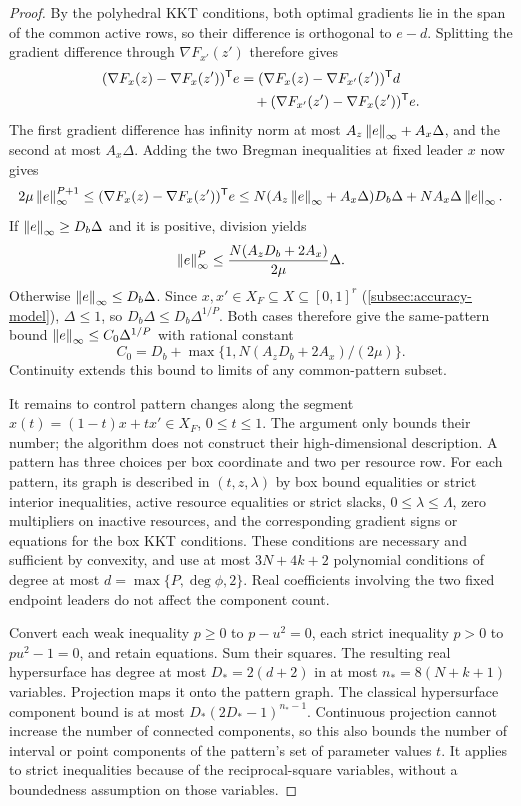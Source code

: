 \begin{proof}
By the polyhedral KKT conditions, both optimal gradients lie in the span
of the common active rows, so their difference is orthogonal to $e-d$.
Splitting the gradient difference through $\nabla F_{x'}(z')$ therefore gives
\[
 \begin{aligned}
 (\nabla F_x(z)-\nabla F_x(z'))^{\mathsf T} e
 &= (\nabla F_x(z)-\nabla F_{x'}(z'))^{\mathsf T} d\\
 &\quad +(\nabla F_{x'}(z')-\nabla F_x(z'))^{\mathsf T} e.
 \end{aligned}
\]
The first gradient difference has infinity norm at most
$A_z\left\lVert e\right\rVert_\infty+A_x\Delta$, and the second at most $A_x\Delta$.
Adding the two Bregman inequalities at fixed leader $x$ now gives
\[
 2\mu\left\lVert e\right\rVert_\infty^{P+1}
 \le(\nabla F_x(z)-\nabla F_x(z'))^{\mathsf T} e
 \le N(A_z\left\lVert e\right\rVert_\infty+A_x\Delta)D_b\Delta
                                      +NA_x\Delta\left\lVert e\right\rVert_\infty.
\]
If $\left\lVert e\right\rVert_\infty\ge D_b\Delta$ and it is positive, division yields
\[
 \left\lVert e\right\rVert_\infty^P\le\frac{N(A_zD_b+2A_x)}{2\mu}\Delta.
\]
Otherwise $\left\lVert e\right\rVert_\infty\le D_b\Delta$. Since $x,x'\in X_F\subseteq
X\subseteq[0,1]^r$ (\cref{subsec:accuracy-model}), $\Delta\le1$, so
$D_b\Delta\le D_b\Delta^{1/P}$. Both cases therefore give the same-pattern
bound $\left\lVert e\right\rVert_\infty\le C_0\Delta^{1/P}$ with rational constant
\[
 C_0=D_b+\max\{1,N(A_zD_b+2A_x)/(2\mu)\}.
\]
Continuity extends this bound to limits of any common-pattern subset.

It remains to control pattern changes along the segment
$x(t)=(1-t)x+tx'\in X_F$, $0\le t\le1$. The argument only bounds
their number; the algorithm does not construct their high-dimensional
description. A pattern has three choices per box coordinate and two per
resource row. For each pattern, its graph is described in $(t,z,\lambda)$
by box bound equalities or strict interior inequalities, active resource
equalities or strict slacks, $0\le\lambda\le\Lambda$, zero multipliers
on inactive resources, and the corresponding gradient signs or equations
for the box KKT conditions. These conditions are necessary and sufficient
by convexity, and use at most $3N+4k+2$ polynomial conditions of degree
at most $d=\max\{P,\deg\phi,2\}$. Real coefficients involving the two
fixed endpoint leaders do not affect the component count.

Convert each weak inequality $p\ge0$ to $p-u^2=0$, each strict
inequality $p>0$ to $pu^2-1=0$, and retain equations. Sum their squares.
The resulting real hypersurface has degree at most $D_*=2(d+2)$ in
at most $n_*=8(N+k+1)$ variables. Projection maps it onto the pattern
graph. The classical hypersurface component bound
\cite{Milnor1964} is at most $D_*(2D_*-1)^{n_*-1}$.
Continuous projection cannot increase the number of connected components,
so this also bounds the number of interval or point components of the
pattern's set of parameter values $t$. It applies to strict inequalities
because of the reciprocal-square variables, without a boundedness
assumption on those variables.


\end{proof}
